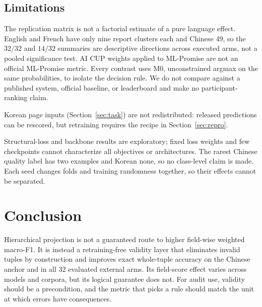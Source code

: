 \subsection{Limitations}
The replication matrix is not a factorial estimate of a pure language
effect. English and French have only nine report clusters each and Chinese
49, so the $32/32$ and $14/32$ summaries are descriptive directions across
executed arms, not a pooled significance test. AI CUP weights applied to ML-Promise are not an official
ML-Promise metric. Every contrast uses M0, unconstrained argmax on the same probabilities, to
isolate the decision rule. We do not compare against a published system,
official baseline, or leaderboard and make no participant-ranking claim.

Korean page inputs (Section~\ref{sec:task}) are not redistributed: released predictions
can be rescored, but retraining requires the recipe in
Section~\ref{sec:repro}.

\begin{sloppypar}
Structural-loss and backbone results are exploratory; fixed loss weights and
few checkpoints cannot characterize all objectives or architectures. The
rarest Chinese quality label has two examples and Korean none, so no
class-level claim is made. Each seed changes folds and training randomness
together, so their effects cannot be separated.
\end{sloppypar}

\section{Conclusion}

Hierarchical projection is not a guaranteed route to higher field-wise
weighted macro-F1. It is instead a retraining-free validity layer that
eliminates invalid tuples by construction and
improves exact whole-tuple accuracy on the Chinese anchor and in all 32
evaluated external arms.
Its field-score effect varies across models and corpora, but its logical guarantee does not.
For audit use, validity should be a precondition, and the metric that picks a
rule should match the unit at which errors have consequences.
